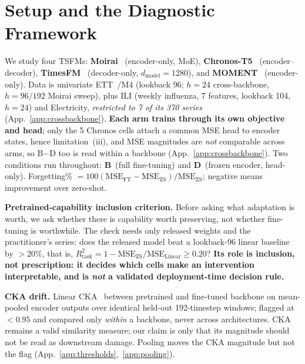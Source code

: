 \documentclass{article}
\begin{document}
\section{Setup and the Diagnostic Framework}
\label{sec:method}

We study four TSFMs: \textbf{Moirai}~\citep{woo2024moirai} (encoder-only, MoE), \textbf{Chronos-T5}~\citep{ansari2024chronos} (encoder--decoder), \textbf{TimesFM}~\citep{das2024timeseries} (decoder-only, $d_\text{model}{=}1280$), and \textbf{MOMENT}~\citep{goswami2024moment} (encoder-only).
Data is univariate ETT~\citep{zhou2021informer}/M4 (lookback 96; $h{=}24$ cross-backbone, $h{=}96/192$ Moirai sweep), plus ILI (weekly influenza, 7 features, lookback 104, $h{=}24$) and Electricity, \emph{restricted to 7 of its 370 series} (App.~\ref{app:crossbackbone}).
\textbf{Each arm trains through its own objective and head}; only the 5 Chronos cells attach a common MSE head to encoder states, hence limitation~(iii), and MSE magnitudes are \emph{not} comparable across arms, so B$-$D too is read within a backbone (App.~\ref{app:crossbackbone}).
Two conditions run throughout: \textbf{B}~(full fine-tuning) and \textbf{D}~(frozen encoder, head-only). Forgetting\% $= 100 (\text{MSE}_\text{FT} - \text{MSE}_\text{ZS}) / \text{MSE}_\text{ZS}$; negative means improvement over zero-shot.

\textbf{Pretrained-capability inclusion criterion.}
Before asking what adaptation is worth, we ask whether there is capability worth preserving, not whether fine-tuning is worthwhile. The check needs only released weights and the practitioner's series: does the released model beat a lookback-96 linear baseline by ${>}20\%$, that is, $R^2_\text{task} = 1 - \text{MSE}_\text{ZS} / \text{MSE}_\text{Linear} \geq 0.20$?
\textbf{Its role is inclusion, not prescription: it decides which cells make an intervention interpretable, and is \emph{not} a validated deployment-time decision rule.}

\textbf{CKA drift.}
Linear CKA~\citep{kornblith2019cka} between pretrained and fine-tuned backbone on mean-pooled encoder outputs over identical held-out 192-timestep windows; flagged at $<0.95$ and compared only \emph{within} a backbone, never across architectures. CKA remains a valid similarity measure; our claim is only that its magnitude should not be read as downstream damage.
Pooling moves the CKA magnitude but not the flag (App.~\ref{app:thresholds},~\ref{app:pooling}).
\end{document}
